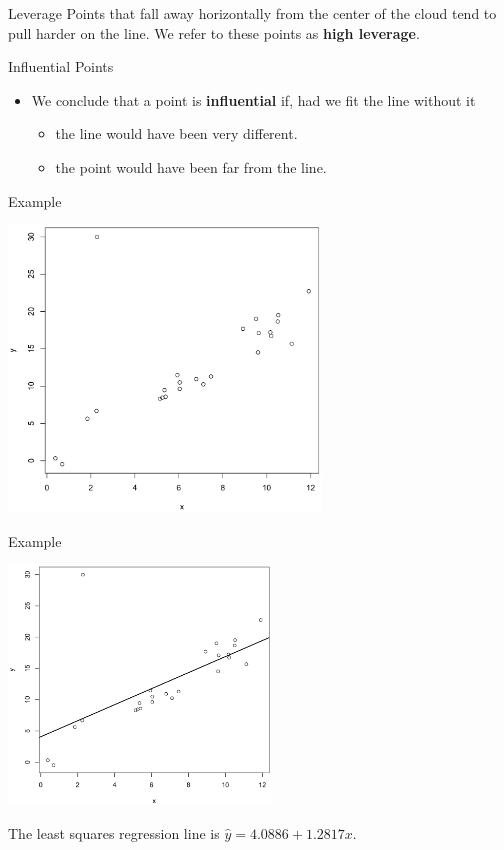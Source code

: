 \begin{frame}{Leverage}
    Points that fall away horizontally from the center of the cloud tend to pull harder on the line. We refer to these points as \textbf{high leverage}.
\end{frame}

\begin{frame}{Influential Points}
    \begin{itemize}
        \item We conclude that a point is \textbf{influential} if, had we fit the line without it
        \begin{itemize}
            \item the line would have been very different.
            \item the point would have been far from the line.
        \end{itemize}
    \end{itemize}
\end{frame}

\begin{frame}{Example}
    \begin{center}
        \includegraphics[height=3in]{images/outlier.png}
    \end{center}
\end{frame}

\begin{frame}{Example}
    \begin{center}
        \includegraphics[height=2.5in]{images/outlierline.png}
    \end{center}
    \vspace{-0.5cm}The least squares regression line is $\hat{y} = 4.0886 + 1.2817x$.
\end{frame}

